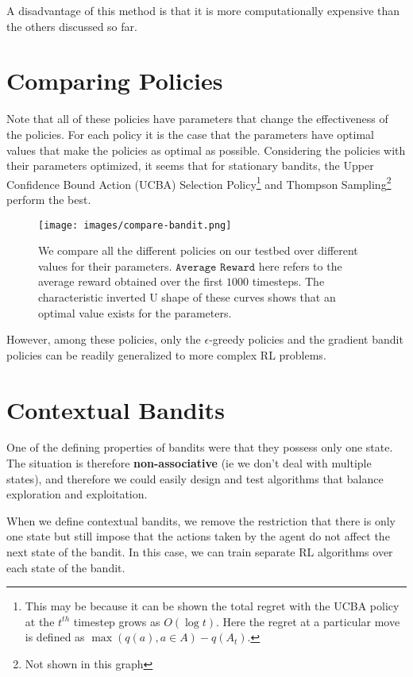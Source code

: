 \documentclass[12pt]{report}
\begin{document}
A disadvantage of this method is that it is more computationally expensive than the others discussed so far.

\section{Comparing Policies}
Note that all of these policies have parameters that change the effectiveness of the policies. For each policy it is the case that the parameters have optimal values that make the policies as optimal as possible.
Considering the policies with their parameters optimized, it seems that for stationary bandits, the Upper Confidence Bound Action (UCBA) Selection Policy\footnote{This may be because it can be shown the total regret with the UCBA policy at the $t^{th}$ timestep grows as $O(\log t)$. Here the regret at a particular move is defined as $\max(q(a), a \in A) - q(A_{t})$.} and Thompson Sampling\footnote{Not shown in this graph} perform the best. 

\begin{figure}[h!]
    \centering
    \texttt{[image: images/compare-bandit.png]}
    \caption{We compare all the different policies on our testbed over different values for their parameters. $\texttt{Average Reward}$ here refers to the average reward obtained over the first $1000$ timesteps. The characteristic inverted U shape of these curves shows that an optimal value exists for the parameters.}
\end{figure}

However, among these policies, only the $\epsilon$-greedy policies and the gradient bandit policies can be readily generalized to more complex RL problems.

\section{Contextual Bandits}
One of the defining properties of bandits were that they possess only one state. The situation is therefore \textbf{non-associative} (ie we don't deal with multiple states), and therefore we could easily design 
and test algorithms that balance exploration and exploitation.

When we define contextual bandits, we remove the restriction that there is only one state but still impose that the actions taken by the agent do not affect the next state of the bandit. In this case, we can train separate RL algorithms 
over each state of the bandit.
\end{document}
